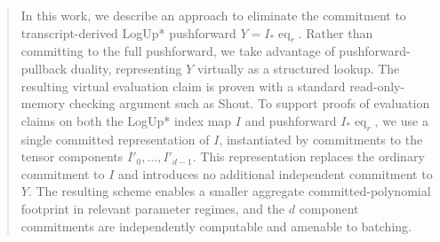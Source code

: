 \begin{abstract}
In this work, we describe an approach to eliminate the commitment to
transcript-derived LogUp* pushforward \(Y=I_*\operatorname{eq}_r\).
Rather than committing to the full pushforward, we take advantage of pushforward-pullback duality,
representing \(Y\) virtually as a structured lookup. The resulting virtual evaluation claim is
proven with a standard read-only-memory checking argument such as Shout. To support proofs of evaluation 
claims on both the LogUp* index map \(I\) and pushforward \(I_*\operatorname{eq}_r\), we use a single 
committed representation of \(I\), instantiated by commitments to the tensor components 
\(I'_0,\ldots,I'_{d-1}\). This representation replaces the ordinary commitment to \(I\) and 
introduces no additional independent commitment to \(Y\). The resulting scheme enables a smaller 
aggregate committed-polynomial footprint in relevant parameter regimes, and the \(d\) component 
commitments are independently computable and amenable to batching.
\end{abstract}
